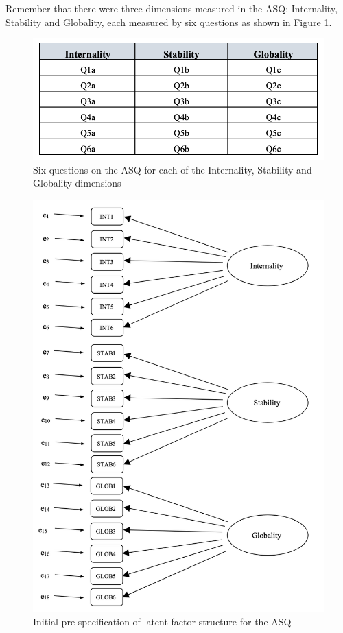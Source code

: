 \documentclass[
]{book}
\begin{document}
Remember that there were three dimensions measured in the ASQ: Internality, Stability and Globality, each measured by six questions as shown in Figure \ref{fig:MTMM2}.

\begin{figure}

{\centering \includegraphics[width=1\linewidth]{img/factoranalysis/MTMM2} 

}

\caption{Six questions on the ASQ for each of the Internality, Stability and Globality dimensions}\label{fig:MTMM2}
\end{figure}

\begin{figure}

{\centering \includegraphics[width=1\linewidth]{img/factoranalysis/MTMM3} 

}

\caption{Initial pre-specification of latent factor structure for the ASQ}\label{fig:MTMM3}
\end{figure}
\end{document}
